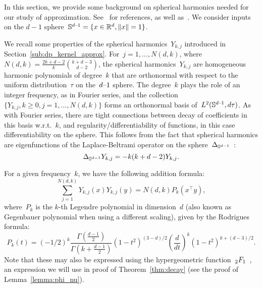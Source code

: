 

In this section, we provide some background on spherical harmonics needed for our study of approximation.
See~\citep{costas2014spherical,atkinson2012spherical,ismail2005classical} for references, as well as~\citep[Appendix D]{bach2017breaking}.
We consider inputs on the $d-1$ sphere~$\mathbb S^{{d\text{--}1}} = \{x \in {\mathbb R}^d, \|x\| = 1\}$.

We recall some properties of the spherical harmonics~$Y_{k,j}$ introduced in Section~\ref{sub:dp_kernel_approx}.
For~$j = 1, \ldots, N(d, k)$, where~$N(d,k) = \frac{2k + d - 2}{k} {k + d - 3 \choose d - 2}$, the spherical harmonics~$Y_{k,j}$ are homogeneous harmonic polynomials of degree~$k$ that are orthonormal with respect to the uniform distribution~$\tau$ on the~${d\text{--}1}$ sphere.
The degree~$k$ plays the role of an integer frequency, as in Fourier series, and the collection~$\{Y_{k,j}, k \geq 0, j = 1, \ldots, N(d,k)\}$ forms an orthonormal basis of~$L^2({\mathbb S}^{{d\text{--}1}}, d\tau)$.
As with Fourier series, there are tight connections between decay of coefficients in this basis w.r.t.~$k$, and regularity/differentiability of functions, in this case differentiability on the sphere.
This follows from the fact that spherical harmonics are eigenfunctions of the Laplace-Beltrami operator on the sphere~$\Delta_{{\mathbb S}^{d-1}}$~\citep[see][Proposition 4.5]{costas2014spherical}:
\begin{equation}
\label{eq:laplace_beltrami}
\Delta_{{\mathbb S}^{d-1}} Y_{k,j} = -k(k+d-2)Y_{k,j}.
\end{equation}

For a given frequency~$k$, we have the following addition formula:
\begin{equation}
\label{eq:spherical_addition}
\sum_{j=1}^{N(d, k)} Y_{k,j}(x) Y_{k,j}(y) = N(d, k) P_k( x^\top y ),
\end{equation}
where~$P_k$ is the $k$-th Legendre polynomial in dimension~$d$ (also known as Gegenbauer polynomial when using a different scaling),
given by the Rodrigues formula:
\begin{equation}
\label{eq:rodrigues}
P_k(t) = (-1/2)^k \frac{\Gamma(\frac{d-1}{2})}{\Gamma(k + \frac{d-1}{2})} (1 - t^2)^{(3-d)/2}
	\left(\frac{d}{dt}\right)^k (1 - t^2)^{k+(d-3)/2}.
\end{equation}
Note that these may also be expressed using the hypergeometric function~${}_{2}F_{1}$~\citep[see, \eg,][Section 4.5]{ismail2005classical}, an expression we will use in proof of Theorem~\ref{thm:decay} (see the proof of Lemma~\ref{lemma:phi_nu}).

